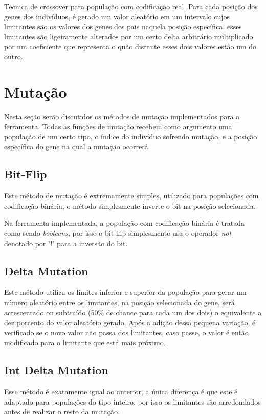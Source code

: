 \documentclass[12pt]{article}
\begin{document}
Técnica de crossover para população com codificação real. Para cada posição dos genes dos indivíduos, 
é gerado um valor aleatório em um intervalo cujos limitantes são os valores dos genes dos pais naquela 
posição específica, esses limitantes são ligeiramente alterados por um certo delta arbitrário multiplicado 
por um coeficiente que representa o quão distante esses dois valores estão um do outro.

\section{Mutação}

Nesta seção serão discutidos os métodos de mutação implementados para a ferramenta. Todas as funções de 
mutação recebem como argumento uma população de um certo tipo, o índice do indivíduo sofrendo mutação, e 
a posição específica do gene na qual a mutação ocorrerá

\subsection{Bit-Flip}

Este método de mutação é extremamente simples, utilizado para populações com codificação binária, 
o método simplesmente inverte o bit na posição selecionada.

Na ferramenta implementada, a população com codificação binária é tratada como sendo \textit{booleans}, 
por isso o bit-flip simplesmente usa o operador \textit{not} denotado por '!' para a inversão do bit.

\subsection{Delta Mutation}

Este método utiliza os limites inferior e superior da população para gerar um número aleatório entre os limitantes, 
na posição selecionada do gene, será acrescentado ou subtraído (50\% de chance para cada um dos dois) o 
equivalente a dez porcento do valor aleatório gerado. Após a adição dessa pequena variação, é verificado 
se o novo valor não passa dos limitantes, caso passe, o valor é então modificado para o limitante que 
está mais próximo.

\subsection{Int Delta Mutation} 

Esse método é exatamente igual ao anterior, a única diferença é que este é adaptado para populações 
do tipo inteiro, por isso os limitantes são arredondados antes de realizar o resto da mutação.
\end{document}
